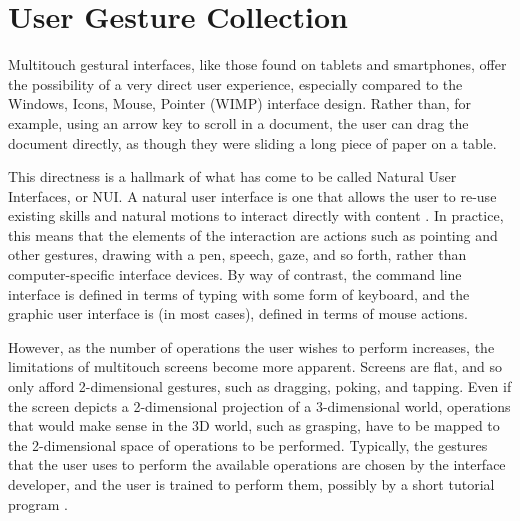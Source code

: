 \chapter{User Gesture Collection}\label{chapter:user_experiment}

Multitouch gestural interfaces, like those found on tablets and smartphones, offer the possibility of a very direct user experience, especially compared to the Windows, Icons, Mouse, Pointer (WIMP) interface design. 
Rather than, for example, using an arrow key to scroll in a document, the user can drag the document directly, as though they were sliding a long piece of paper on a table. 

This directness is a hallmark of what has come to be called Natural User Interfaces, or NUI. 
A natural user interface is one that allows the user to re-use existing skills and natural motions to interact directly with content \citep{blakeNUIWin}. 
In practice, this means that the elements of the interaction are actions such as pointing and other gestures, drawing with a pen, speech, gaze, and so forth, rather than computer-specific interface devices. 
By way of contrast, the command line interface is defined in terms of typing with some form of keyboard, and the graphic user interface is (in most cases), defined in terms of mouse actions. 

However, as the number of operations the user wishes to perform increases, the limitations of multitouch screens become more apparent. 
Screens are flat, and so only afford 2-dimensional gestures, such as dragging, poking, and tapping. 
Even if the screen depicts a 2-dimensional projection of a 3-dimensional world, operations that would make sense in the 3D world, such as grasping, have to be mapped to the 2-dimensional space of operations to be performed. 
Typically, the gestures that the user uses to perform the available operations are chosen by the interface developer, and the user is trained to perform them, possibly by a short tutorial program \citep{wobbrock2009user, vanacken2008ghosts, freeman2009shadowguides}. 

